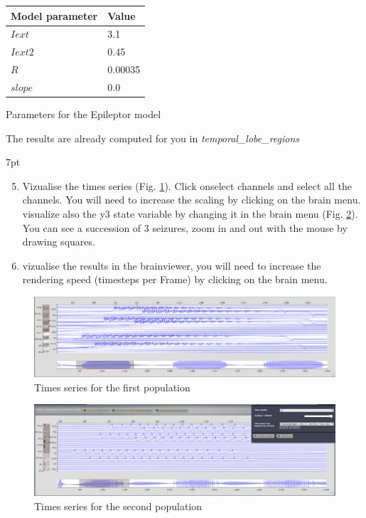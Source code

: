 \documentclass{tufte-handout}
\newenvironment{simulation}{%
  \def\FrameCommand{%
    \hspace{1pt}%
    {\color{ForestGreen}\vrule width 2pt}%
    {\color{simulationshade}\vrule width 4pt}%
    \colorbox{simulationshade}%
  }%
  \MakeFramed{\advance\hsize-\width\FrameRestore}%
  \noindent\hspace{-4.55pt}%
  \begin{adjustwidth}{}{7pt}%
  \vspace{2pt}\vspace{2pt}%
}
{%
  \vspace{2pt}\end{adjustwidth}\endMakeFramed%
}
\begin{document}
\begin{margintable}
  \centering
  \selectfont
  \begin{tabular}{ll}
    \toprule
    Model parameter & Value \\
    \midrule
             $Iext$          &   3.1  \\
             $Iext2$          &  0.45   \\
             $R$           &   0.00035        \\
             $slope$           &   0.0   \\
    \bottomrule
  \end{tabular}
  \caption{Parameters for the Epileptor model	 }
  \label{tab:modeltab}
\end{margintable}

The results are already computed for you in \textit{temporal\_lobe\_regions}

\begin{simulation}
  \begin{enumerate}
  \setcounter{enumi}{4}
  \item Vizualise the times series (Fig. \ref{fig:first_pop}). Click onselect channels and select all the channels. 
	You will need to increase the scaling by clicking on the brain menu. visualize also the y3 state variable by 
	changing it in the brain menu (Fig. \ref{fig:second_pop}). You can see a succession of 3 seizures, zoom in and out with the mouse by drawing squares.
  \item vizualise the results in the brainviewer, you will need to increase the rendering speed 
	(timesteps per Frame) by clicking on the brain menu.
\end{enumerate}
\end{simulation}
  
\begin{figure}[h]
  \includegraphics[width=\linewidth]{Handout_UI_ModellingAnEpilepticPatient_FirstPopulationTimesSeries}%
  \caption{Times series for the first population}%
  \label{fig:first_pop}%
\end{figure}

\begin{figure}[h]
  \includegraphics[width=\linewidth]{Handout_UI_ModellingAnEpilepticPatient_SecondPopulationTimesSeries}%
  \caption{Times series for the second population}%
  \label{fig:second_pop}%
\end{figure}
\end{document}
